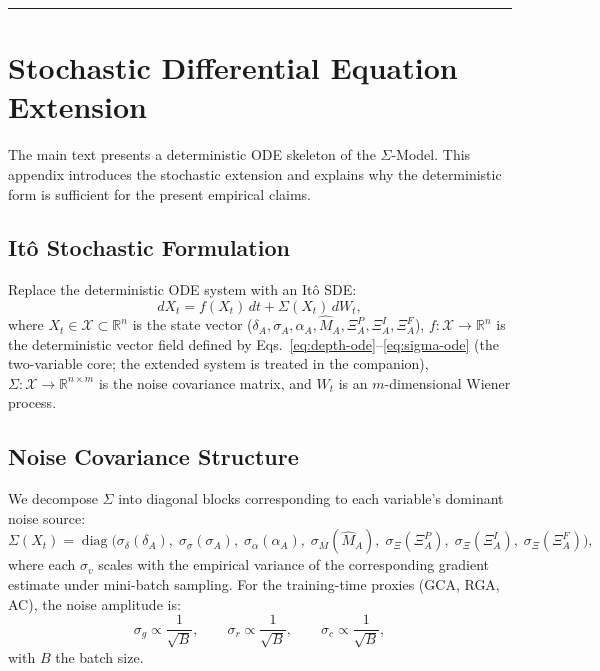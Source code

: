 \documentclass[11pt]{article}
\theoremstyle{definition}
\theoremstyle{plain}
\begin{document}
\noindent\rule{\linewidth}{0.4pt}


\clearpage
\section{Stochastic Differential Equation Extension}\label{app:sde}

The main text presents a deterministic ODE skeleton of the $\Sigma$-Model.
This appendix introduces the stochastic extension and explains why the
deterministic form is sufficient for the present empirical claims.

\subsection{It\^o Stochastic Formulation}

Replace the deterministic ODE system with an It\^o SDE:
\begin{equation}\label{eq:sde-full}
dX_t = f(X_t)\,dt + \Sigma(X_t)\,dW_t,
\end{equation}
where $X_t \in \mathcal{X} \subset \mathbb{R}^n$ is the state vector
($\delta_A, \sigma_A, \alpha_A, \hat{M}_A, \Xi_A^P, \Xi_A^I, \Xi_A^F$),
$f: \mathcal{X} \to \mathbb{R}^n$ is the deterministic vector field
defined by Eqs.~\eqref{eq:depth-ode}--\eqref{eq:sigma-ode} (the
two-variable core; the extended system is treated in the companion),
$\Sigma: \mathcal{X} \to \mathbb{R}^{n \times m}$ is the noise
covariance matrix, and $W_t$ is an $m$-dimensional Wiener process.

\subsection{Noise Covariance Structure}

We decompose $\Sigma$ into diagonal blocks corresponding to each variable's
dominant noise source:
\begin{equation}
\Sigma(X_t) = \operatorname{diag}\bigl(
\sigma_\delta(\delta_A),\; \sigma_\sigma(\sigma_A),\;
\sigma_\alpha(\alpha_A),\;\sigma_M(\hat{M}_A),\;
\sigma_\Xi(\Xi_A^P),\;\sigma_\Xi(\Xi_A^I),\;\sigma_\Xi(\Xi_A^F)
\bigr),
\end{equation}
where each $\sigma_v$ scales with the empirical variance of the
corresponding gradient estimate under mini-batch sampling. For the
training-time proxies (GCA, RGA, AC), the noise amplitude is:
\begin{equation}
\sigma_g \propto \frac{1}{\sqrt{B}}, \qquad
\sigma_r \propto \frac{1}{\sqrt{B}}, \qquad
\sigma_c \propto \frac{1}{\sqrt{B}},
\end{equation}
with $B$ the batch size.
\end{document}
